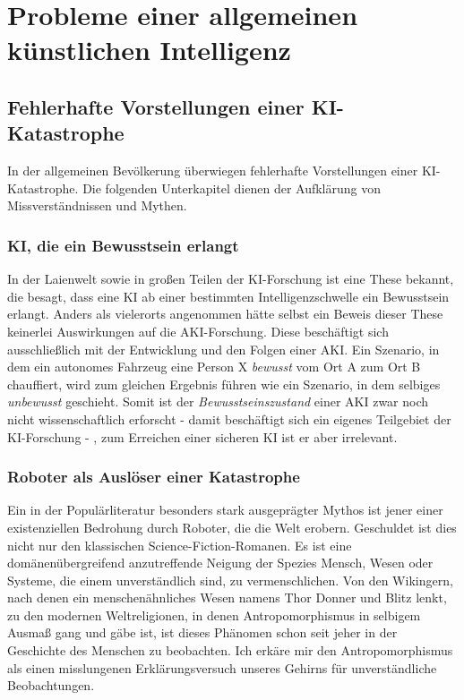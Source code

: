 \chapter{Probleme einer allgemeinen künstlichen Intelligenz}
\section{Fehlerhafte Vorstellungen einer KI-Katastrophe}
In der allgemeinen Bevölkerung überwiegen fehlerhafte Vorstellungen einer KI-Katastrophe. Die folgenden Unterkapitel dienen der Aufklärung von Missverständnissen und Mythen.
\subsection{KI, die ein Bewusstsein erlangt}
In der Laienwelt sowie in großen Teilen der KI-Forschung ist eine These bekannt, die besagt, dass eine KI ab einer bestimmten Intelligenzschwelle ein Bewusstsein erlangt. Anders als vielerorts angenommen hätte selbst ein Beweis dieser These keinerlei Auswirkungen auf die AKI-Forschung. Diese beschäftigt sich ausschließlich mit der Entwicklung und den Folgen einer AKI. Ein Szenario, in dem ein autonomes Fahrzeug eine Person X \emph{bewusst} vom Ort A zum Ort B chauffiert, wird zum gleichen Ergebnis führen wie ein Szenario, in dem selbiges \emph{unbewusst} geschieht. Somit ist der \emph{Bewusstseinszustand} einer AKI zwar noch nicht wissenschaftlich erforscht - damit beschäftigt sich ein eigenes Teilgebiet der KI-Forschung - , zum Erreichen einer sicheren KI ist er aber irrelevant. 
\subsection{Roboter als Auslöser einer Katastrophe}
Ein in der Populärliteratur besonders stark ausgeprägter Mythos ist jener einer existenziellen Bedrohung durch Roboter, die die Welt erobern. Geschuldet ist dies nicht nur den klassischen Science-Fiction-Romanen. Es ist eine domänenübergreifend anzutreffende Neigung der Spezies Mensch, Wesen oder Systeme, die einem unverständlich sind, zu vermenschlichen. Von den Wikingern, nach denen ein menschenähnliches Wesen namens Thor Donner und Blitz lenkt, zu den modernen Weltreligionen, in denen Antropomorphismus in selbigem Ausmaß gang und gäbe ist, ist dieses Phänomen schon seit jeher in der Geschichte des Menschen zu beobachten. Ich erkäre mir den Antropomorphismus als einen misslungenen Erklärungsversuch unseres Gehirns für unverständliche Beobachtungen.

